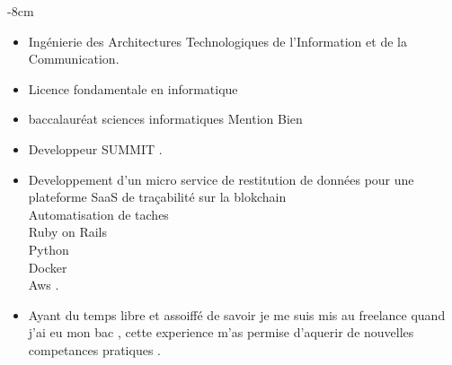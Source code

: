 \documentclass[10pt,a4paper]{altacv}
\begin{document}
\begin{adjustwidth}{}{-8cm}
\makecvheader
\end{adjustwidth}
\marginpar{\vspace*{\dimexpr1pt-\baselineskip}\raggedright}
 {}
\begin{itemize}
	\item Ingénierie des Architectures Technologiques de l'Information et de la Communication. 
\end{itemize}
 {}
\begin{itemize}
	\item Licence fondamentale en informatique 
\end{itemize}
 {}
\begin{itemize}
	\item baccalauréat sciences informatiques Mention Bien 
\end{itemize}
 {}
\begin{itemize}
	\item Developpeur SUMMIT . 
\end{itemize}
 {}
\begin{itemize}
	\item Developpement d'un micro service de restitution de données pour une plateforme SaaS de traçabilité sur la blokchain \\ Automatisation de taches \\ Ruby on Rails \\ Python \\ Docker \\ Aws . 
\end{itemize}
 {}
\begin{itemize}
	\item Ayant du temps libre et assoiffé de savoir je me suis mis au freelance quand j'ai eu mon bac , cette experience m'as permise d'aquerir de nouvelles competances pratiques . 
\end{itemize}
\end{document}
